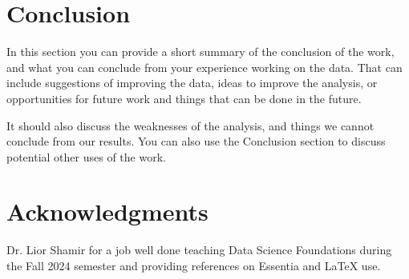 \documentclass[article,pdftex,12pt,a4paper]{article}
\begin{document}
\section{Conclusion}
In this section you can provide a short summary of the conclusion of the work, and what you can conclude from your experience working on the data. That can include suggestions of improving the data, ideas to improve the analysis, or opportunities for future work and things that can be done in the future.

It should also discuss the weaknesses of the analysis, and things we cannot conclude from our results. You can also use the Conclusion section to discuss potential other uses of the work.



\section*{Acknowledgments}
Dr. Lior Shamir for a job well done teaching Data Science Foundations during the Fall 2024 semester and providing references on Essentia and LaTeX use.





\end{document}
